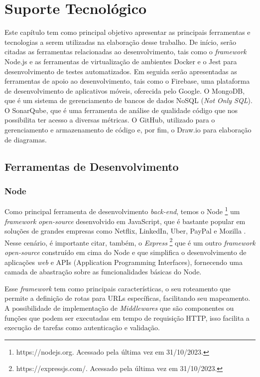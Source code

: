 \chapter[Suporte Tecnológico]{Suporte Tecnológico}
\label{cap:suporte}

Este capítulo tem como principal objetivo apresentar as principais ferramentas e tecnologias 
a serem utilizadas na elaboração desse trabalho. De início, serão citadas as ferramentas 
relacionadas ao desenvolvimento, tais como o \textit{framework} Node.js e as ferramentas de 
virtualização de ambientes Docker e o Jest para desenvolvimento de testes automatizados. Em 
seguida serão apresentadas as ferramentas de apoio ao desenvolvimento, tais como o Firebase, 
uma plataforma de desenvolvimento de aplicativos móveis, oferecida pelo Google. O MongoDB, 
que é um sistema de gerenciamento de bancos de dados NoSQL (\textit{Not Only SQL}). O SonarQube, 
que é uma ferramenta de análise de qualidade código que nos possibilita ter acesso a diversas 
métricas. O GitHub, utilizado para o gerenciamento e armazenamento de código e, por fim, o 
Draw.io para elaboração de diagramas. 

\section{Ferramentas de Desenvolvimento}

\subsection{Node}

Como principal ferramenta de desenvolvimento \textit{back-end}, temos o Node \footnote{https://nodejs.org. Acessado pela última vez em 31/10/2023.} 
um \textit{framework} \textit{open-source} desenvolvido em JavaScript, que é bastante popular 
em soluções de grandes empresas como Netflix, LinkedIn, Uber, PayPal e Mozilla \cite{Kinsta}. 
Nesse cenário, é importante citar, também, o \textit{Express} \footnote{https://expressjs.com/. Acessado pela última vez em 31/10/2023.} 
que é um outro \textit{framework} \textit{open-source} construído em cima do Node e que 
simplifica o desenvolvimento de aplicações \textit{web} e APIs (Application Programming 
Interfaces), fornecendo uma camada de abastração sobre as funcionalidades básicas do Node.

Esse \textit{framework} tem como principais características, o seu roteamento que permite 
a definição de rotas para URLs específicas, facilitando seu mapeamento. A possibilidade de 
implementação de \textit{Middlewares} que são componentes ou funções que podem ser executadas 
em tempo de requisição HTTP, isso facilita a execução de tarefas como autenticação e validação. 

